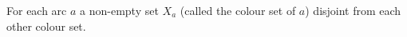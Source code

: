 \documentclass[preview]{standalone}
\begin{document}
\begin{center}
For each arc $a$ a non-empty set $X_a$ (called the colour set of $a$) disjoint from each other colour set.
\end{center}
\end{document}
